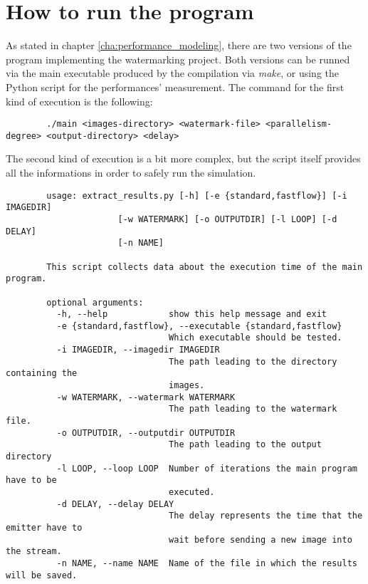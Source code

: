 \chapter{How to run the program} %
\label{cha:how_to_run_the_program}
    \setcounter{page}{2}
    As stated in chapter \ref{cha:performance_modeling}, there are two versions of the program implementing
    the watermarking project. Both versions can be runned via the main executable produced by the compilation
    via \textit{make}, or using the Python script for the performances' measurement. The command for the
    first kind of execution is the following:

    \begin{verbatim}
        ./main <images-directory> <watermark-file> <parallelism-degree> <output-directory> <delay>
    \end{verbatim}

    The second kind of execution is a bit more complex, but the script itself provides all the informations
    in order to safely run the simulation.

    \begin{verbatim}
        usage: extract_results.py [-h] [-e {standard,fastflow}] [-i IMAGEDIR]
                      [-w WATERMARK] [-o OUTPUTDIR] [-l LOOP] [-d DELAY]
                      [-n NAME]

        This script collects data about the execution time of the main program.

        optional arguments:
          -h, --help            show this help message and exit
          -e {standard,fastflow}, --executable {standard,fastflow}
                                Which executable should be tested.
          -i IMAGEDIR, --imagedir IMAGEDIR
                                The path leading to the directory containing the
                                images.
          -w WATERMARK, --watermark WATERMARK
                                The path leading to the watermark file.
          -o OUTPUTDIR, --outputdir OUTPUTDIR
                                The path leading to the output directory
          -l LOOP, --loop LOOP  Number of iterations the main program have to be
                                executed.
          -d DELAY, --delay DELAY
                                The delay represents the time that the emitter have to
                                wait before sending a new image into the stream.
          -n NAME, --name NAME  Name of the file in which the results will be saved.
    \end{verbatim}
